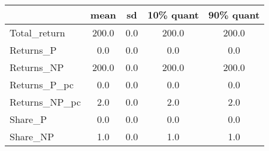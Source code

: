 \begin{tabular}{lcccc}
\toprule
{} &   mean &   sd &  10\% quant &  90\% quant \\
\midrule
Total\_return  &  200.0 &  0.0 &      200.0 &      200.0 \\
Returns\_P     &    0.0 &  0.0 &        0.0 &        0.0 \\
Returns\_NP    &  200.0 &  0.0 &      200.0 &      200.0 \\
Returns\_P\_pc  &    0.0 &  0.0 &        0.0 &        0.0 \\
Returns\_NP\_pc &    2.0 &  0.0 &        2.0 &        2.0 \\
Share\_P       &    0.0 &  0.0 &        0.0 &        0.0 \\
Share\_NP      &    1.0 &  0.0 &        1.0 &        1.0 \\
\bottomrule
\end{tabular}
